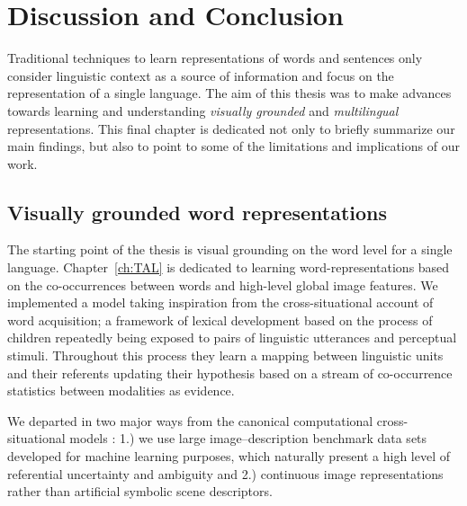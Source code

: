 \chapter{Discussion and Conclusion}
\label{ch:conclusion}

Traditional techniques to learn representations of words and sentences only consider 
linguistic context as a source of information and focus on the representation of a single language.
The aim of this thesis was to make advances towards learning 
and understanding \emph{visually grounded} and \emph{multilingual} representations. 
This final chapter is dedicated not only to briefly summarize our main findings, but also to 
point to some of the limitations and implications of our work.


\section{Visually grounded word representations}
The starting point of the thesis is visual grounding on the word level for a single language.
Chapter~\ref{ch:TAL} is dedicated to learning word-representations based on the co-occurrences between 
words and high-level global image features. We implemented a model taking inspiration from
the cross-situational account of word acquisition; a framework of lexical development
based on the process of children repeatedly being exposed to pairs of linguistic utterances and 
perceptual stimuli.  Throughout this process they learn a mapping between linguistic 
units and their referents updating their hypothesis based on a stream of co-occurrence statistics
between modalities as evidence. 


We departed in two major ways from the canonical computational cross-situational models 
 \citep{siskind.96,fontanari2009cross,fazly.etal.10,kachergis2012associative,matusevych2013automatic,yu2013grounded}: 
1.) we use large image--description benchmark data sets developed for machine learning purposes, 
which naturally present a high level of referential uncertainty and ambiguity and
2.) continuous image representations rather than artificial symbolic scene descriptors.

